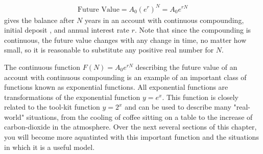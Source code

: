 \documentclass[10pt,]{book}
\theoremstyle{ptxdefinitionnotitle}
\theoremstyle{ptxdefinitiontitle}
\theoremstyle{ptxdefinitionnotitle}
\theoremstyle{ptxdefinitiontitle}
\theoremstyle{ptxdefinitionnotitle}
\theoremstyle{ptxdefinitiontitle}
\numberwithin{equation}{section}
\begin{document}
%
\begin{gather*}
\text{Future Value} = A_0 (e^r)^N = A_0 e^{rN}
\end{gather*}
\hypertarget{p-220}{}%
gives the balance after \(N\) years in an account with continuous compounding, initial deposit , and annual interest rate \(r\).  Note that since the compounding is continuous, the future value changes with any change in time, no matter how small, so it is reasonable to substitute any positive real number for \(N\).%
\par
\hypertarget{p-221}{}%
The continuous function \(F(N)=A_0 e^{rN}\) describing the future value of an account with continuous compounding is an example of an important class of functions known as exponential functions.  All exponential functions are transformations of the exponential function \(y=e^x\).  This function is closely related to the tool-kit function \(y=2^x\) and can be used to describe many "real-world" situations, from the cooling of coffee sitting on a table to the increase of carbon-dioxide in the atmosphere.  Over the next several sections of this chapter, you will become more aquatinted with this important function and the situations in which it is a useful model.%
\typeout{************************************************}
\typeout{************************************************}
\end{document}
